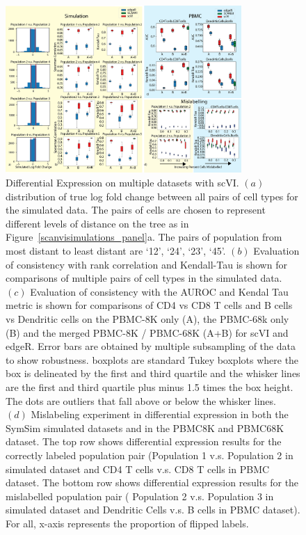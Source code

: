 \begin{figure}[htp]
\centering
\includegraphics[width=0.8\textwidth]{figures/DE_maintext.png}
\caption[Differential Expression on multiple datasets with scVI]{Differential Expression on multiple datasets with scVI. $(a)$ distribution of true log fold change between all pairs of cell types for the simulated data. The pairs of cells are chosen to represent different levels of distance on the tree as in Figure~\ref{scanvisimulations_panel}a. The pairs of population from most distant to least distant are `12', `24', `23', `45'. 
$(b)$ Evaluation of consistency with rank correlation and Kendall-Tau is shown for comparisons of multiple pairs of cell types in the simulated data. 
$(c)$ Evaluation of consistency with the AUROC and Kendal Tau metric is shown for comparisons of CD4 vs CD8 T cells and B cells vs Dendritic cells on the PBMC-8K only (A), the PBMC-68k only (B) and the merged PBMC-8K / PBMC-68K (A+B) for scVI and edgeR. Error bars are obtained by multiple subsampling of the data to show robustness.  boxplots are standard Tukey boxplots where the box is delineated by the first and third quartile and the whisker lines are the first and third quartile plus minus 1.5 times the box height. The dots are outliers that fall above or below the whisker lines.
$(d)$ Mislabeling experiment in differential expression in both the SymSim simulated datasets and in the PBMC8K and PBMC68K dataset. The top row shows differential expression results for the correctly labeled population pair (Population 1 v.s. Population 2 in simulated dataset and CD4 T cells v.s. CD8 T cells in PBMC dataset. The bottom row shows differential expression results for the mislabelled population pair ( Population 2 v.s. Population 3 in simulated dataset and Dendritic Cells v.s. B cells in PBMC dataset). For all, x-axis represents the proportion of flipped labels. }
\label{scanvide_panel}
\end{figure}

